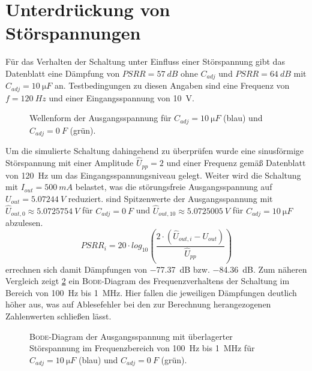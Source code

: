 	\section{Unterdrückung von Störspannungen}\label{sec:stoerspannungen}
		Für das Verhalten der Schaltung unter Einfluss einer Störspannung gibt das Datenblatt eine Dämpfung von \(PSRR = \SI{57}{dB}\) ohne
		\(C_{adj}\) und \(PSRR = \SI{64}{dB}\) mit \(C_{adj} = \SI{10}{\micro F}\) an. Testbedingungen zu diesen Angaben sind eine
		Frequenz von \(f = \SI{120}{Hz}\) und einer Eingangsspannung von \SI{10}{V}.\par
		\begin{figure}[h]
			\centering
			
			\caption[Wellenform der Ausgangsspannung mit Störspannung]{Wellenform der Ausgangsspannung für \(C_{adj} = \SI{10}{\micro F}\) (blau) und \(C_{adj} = \SI{0}{F}\) (grün).}
			\label{fig:ripple rejection}
		\end{figure}
		Um die simulierte Schaltung dahingehend zu überprüfen wurde eine sinusförmige Störspannung mit einer Amplitude \(\hat{U}_{pp} = 2\) und einer Frequenz gemäß
		Datenblatt von \SI{120}{Hz} um das Eingangsspannungsniveau gelegt. Weiter wird die Schaltung mit \(I_{out} = \SI{500}{mA}\) belastet, was die störungsfreie Ausgangsspannung
		auf \(U_{out} = \SI{5,07244}{V}\) reduziert.  sind Spitzenwerte der Ausgangsspannung mit
		\(\hat{U}_{out,0} \approx \SI{5,0725754}{V}\) für \(C_{adj} = \SI{0}{F}\) und \(\hat{U}_{out,10} \approx \SI{5,0725005}{V}\) für \(C_{adj} = \SI{10}{\micro F}\) abzulesen.
		\begin{equation}
			PSRR_i = 20 \cdot log_{10}\left(\frac{2 \cdot \left(\hat{U}_{out,i} - U_{out}\right)}{\hat{U}_{pp}}\right)
		\end{equation}
		errechnen sich damit Dämpfungen von \SI{-77,37}{dB} bzw. \SI{-84,36}{dB}. Zum näheren Vergleich zeigt \cref{fig:bode} ein \textsc{Bode}-Diagram des
		Frequenzverhaltens der Schaltung im Bereich von \SI{100}{Hz} bis \SI{1}{MHz}. Hier fallen die jeweiligen Dämpfungen deutlich höher aus, was auf Ablesefehler
		bei den zur Berechnung herangezogenen Zahlenwerten schließen lässt.
		\begin{figure}[h]
			\centering
			
			\caption[\textsc{Bode}-Diagram der Ausgangsspannung mit überlagerter Störspannung]{\textsc{Bode}-Diagram der Ausgangsspannung mit überlagerter Störspannung im Frequenzbereich
			von \SI{100}{Hz} bis \SI{1}{MHz} für \(C_{adj} = \SI{10}{\micro F}\) (blau) und \(C_{adj} = \SI{0}{F}\) (grün).}
			\label{fig:bode}
		\end{figure}
